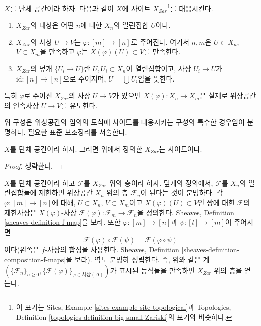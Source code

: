 \medskip\noindent
$X$를 단체 공간이라 하자. 다음과 같이 $X$에 사이트
$X_{Zar}$\footnote{이 표기는 Sites, Example
\ref{sites-example-site-topological}과
Topologies, Definition \ref{topologies-definition-big-small-Zariski}의
표기와 비슷하다.}를 대응시킨다.
\begin{enumerate}
\item $X_{Zar}$의 대상은 어떤 $n$에 대한 $X_n$의 열린집합 $U$이다.
\item $X_{Zar}$의 사상 $U \to V$는
$\varphi : [m] \to [n]$로 주어진다. 여기서 $n, m$은
$U \subset X_n$, $V \subset X_m$을 만족하고 $\varphi$는
$X(\varphi)(U) \subset V$를 만족한다.
\item $X_{Zar}$의 덮개 $\{U_i \to U\}$란
$U, U_i \subset X_n$이 열린집합이고, 사상 $U_i \to U$가
$\text{id} : [n] \to [n]$으로 주어지며, $U = \bigcup U_i$임을 뜻한다.
\end{enumerate}
특히 $\varphi$로 주어진 $X_{Zar}$의 사상 $U \to V$가 있으면
$X(\varphi) : X_n \to X_m$은 실제로 위상공간의 연속사상
$U \to V$를 유도한다.

\noindent
위 구성은 위상공간의 임의의 도식에 사이트를 대응시키는 구성의
특수한 경우임이 분명하다. 필요한 표준 보조정리를 서술한다.

\begin{lemma}
\label{lemma-simplicial-site}
$X$를 단체 공간이라 하자. 그러면 위에서 정의한 $X_{Zar}$는 사이트이다.
\end{lemma}

\begin{proof}
생략한다.
\end{proof}


\noindent
$X$를 단체 공간이라 하고 $\mathcal{F}$를 $X_{Zar}$ 위의 층이라 하자.
덮개의 정의에서, $\mathcal{F}$를 $X_n$의 열린집합들에 제한하면
위상공간 $X_n$ 위의 층 $\mathcal{F}_n$이 된다는 것이 분명하다.
각 $\varphi : [m] \to [n]$에 대해, $U \subset X_n$, $V \subset X_m$이고
$X(\varphi)(U) \subset V$인 쌍에 대한 $\mathcal{F}$의 제한사상은
$X(\varphi)$-사상
$\mathcal{F}(\varphi) : \mathcal{F}_m \to \mathcal{F}_n$을 정의한다.
Sheaves, Definition \ref{sheaves-definition-f-map}을 보라.
또한 $\varphi : [m] \to [n]$과 $\psi : [l] \to [m]$이 주어지면
$$
\mathcal{F}(\varphi) \circ \mathcal{F}(\psi) =
\mathcal{F}(\varphi \circ \psi)
$$
이다(왼쪽은 $f$-사상의 합성을 사용한다. Sheaves, Definition
\ref{sheaves-definition-composition-f-maps}을 보라).
역도 분명히 성립한다. 즉, 위와 같은 계
$(\{\mathcal{F}_n\}_{n \geq 0},
\{\mathcal{F}(\varphi)\}_{\varphi \in \text{사상}(\Delta)})$가
표시된 등식들을 만족하면 $X_{Zar}$ 위의 층을 얻는다.

